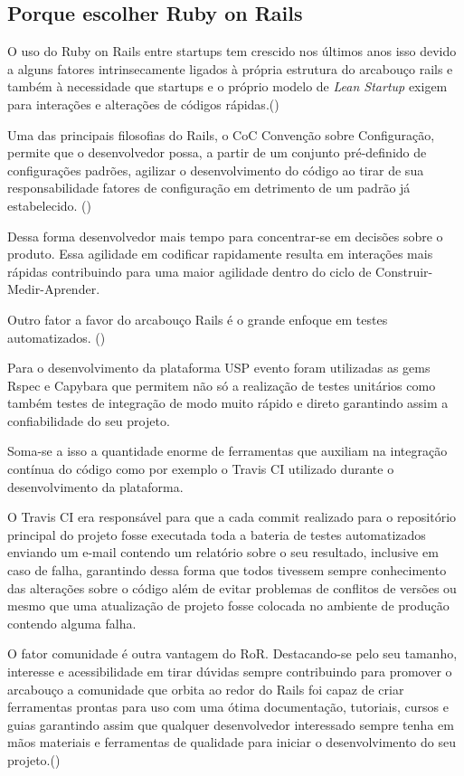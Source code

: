 \subsection{Porque escolher Ruby on Rails }
\par O uso do Ruby on Rails entre startups tem crescido nos últimos anos isso devido a alguns fatores intrinsecamente ligados à própria estrutura do arcabouço rails e também à necessidade que startups e o próprio modelo de \emph{Lean Startup} exigem para interações e alterações de códigos rápidas.(\cite{lilia:16})
\par Uma das principais filosofias do Rails, o CoC \- Convenção sobre Configuração, permite que o desenvolvedor possa, a partir de um conjunto pré-definido de configurações padrões, agilizar o desenvolvimento do código ao tirar de sua responsabilidade fatores de configuração em detrimento de um padrão já estabelecido. (\cite{morrice:15})
\par Dessa forma desenvolvedor mais tempo para concentrar-se em decisões sobre o produto. Essa agilidade em codificar rapidamente resulta em interações mais rápidas contribuindo para uma maior agilidade dentro do ciclo de Construir-Medir-Aprender.
\par Outro fator a favor do arcabouço Rails é o grande enfoque em testes automatizados. (\cite{morrice:15})
\par Para o desenvolvimento da plataforma USP evento foram utilizadas as gems Rspec e Capybara que permitem não só a realização de testes unitários como também testes de integração de modo muito rápido e direto garantindo assim a confiabilidade do seu projeto.
\par Soma-se a isso a quantidade enorme de ferramentas que auxiliam na integração contínua do código como por exemplo o Travis CI utilizado durante o desenvolvimento da plataforma.
\par O Travis CI era responsável para que a cada commit realizado para o repositório principal do projeto fosse executada toda a bateria de testes automatizados enviando um e-mail contendo um relatório sobre o seu resultado, inclusive em caso de falha, garantindo dessa forma que todos tivessem sempre conhecimento das alterações sobre o código além de evitar problemas de conflitos de versões ou mesmo que uma atualização de projeto fosse colocada no ambiente de produção contendo alguma falha.
\par O fator comunidade é outra vantagem do RoR. Destacando-se pelo seu tamanho, interesse e acessibilidade em tirar dúvidas sempre contribuindo para promover o arcabouço a comunidade que orbita ao redor do Rails foi capaz de criar ferramentas prontas para uso com uma ótima documentação, tutoriais, cursos e guias garantindo assim que qualquer desenvolvedor interessado sempre tenha em mãos materiais e ferramentas de qualidade para iniciar o desenvolvimento do seu projeto.(\cite{lilia:16})
